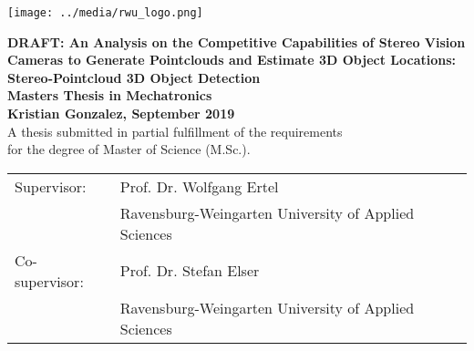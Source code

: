 \pagestyle{empty}
\begin{flushright}
\texttt{[image: ../media/rwu\_logo.png]}
\end{flushright}

\begin{center}
\vspace*{2cm}

\LARGE
\textbf{DRAFT: An Analysis on the Competitive Capabilities of Stereo Vision Cameras to Generate Pointclouds and Estimate 3D Object Locations: Stereo-Pointcloud 3D Object Detection}\\
\Large
\vspace*{2cm}
\noindent \textbf{Masters Thesis in Mechatronics}\\
\vspace*{0.5cm}
\noindent \textbf{Kristian Gonzalez, September 2019}\\
\vspace*{2cm}
\normalsize
A thesis submitted in partial fulfillment of the requirements\\ for the degree
of Master of Science (M.Sc.).

\end{center}

\vspace*{4.5cm}
\begin{tabular}{ll}
Supervisor: & Prof. Dr. Wolfgang Ertel \\
 & Ravensburg-Weingarten University of Applied Sciences\\
Co-supervisor: & Prof. Dr. Stefan Elser\\
 & Ravensburg-Weingarten University of Applied Sciences\\
\end{tabular}
